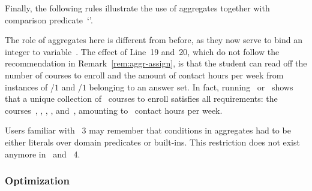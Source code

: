 \begin{example}
Finally, the following rules illustrate the use of aggregates together with comparison predicate~`\code{=}'.
%

%
The role of aggregates here is different from before,
as they now serve to bind an integer to variable~.
The effect of Line~19 and~20,
which do not follow the recommendation in Remark~\ref{rem:aggr-assign},
is that the student can read off the number of courses to enroll and 
the amount of contact hours per week from instances of /$1$ and /$1$
belonging to an answer set.%
%
In fact, running \clingo\ or \clasp\ shows
that a unique collection of~ courses to enroll satisfies all requirements:
the courses~, , , , and~,
amounting to~ contact hours per week.
%
\end{example}

\begin{note}
Users familiar with \gringo~3 may remember that conditions in aggregates
had to be either literals over domain predicates or built-ins.
This restriction does not exist anymore in \gringo\ and \clingo~4.
\end{note}

\subsubsection{Optimization}\label{subsec:gringo:optimize}

